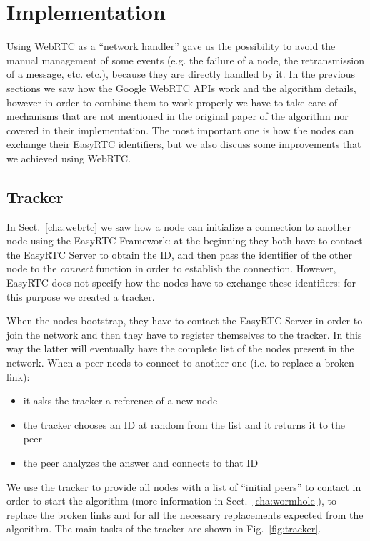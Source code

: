 
\chapter{Implementation}
\label{cha:implementation}

Using WebRTC as a ``network handler'' gave us the possibility to avoid the manual management of some events (e.g. the failure of a node, the retransmission of a message, etc. etc.), because they are directly handled by it. In the previous sections we saw how the Google WebRTC APIs work and the algorithm details, however in order to combine them to work properly we have to take care of mechanisms that are not mentioned in the original paper of the algorithm nor covered in their implementation. The most important one is how the nodes can exchange their EasyRTC identifiers, but we also discuss some improvements that we achieved using WebRTC.

\section{Tracker}
\label{cha:tracker}
In Sect.~\ref{cha:webrtc} we saw how a node can initialize a connection to another node using the EasyRTC Framework: at the beginning they both have to contact the EasyRTC Server to obtain the ID, and then pass the identifier of the other node to the \textsf{\textit{connect}} function in order to establish the connection. However, EasyRTC does not specify how the nodes have to exchange these identifiers: for this purpose we created a tracker. 

When the nodes bootstrap, they have to contact the EasyRTC Server in order to join the network and then they have to register themselves to the tracker. In this way the latter will eventually have the complete list of the nodes present in the network. When a peer needs to connect to another one (i.e. to replace a broken link):
\begin{itemize}
	\item it asks the tracker a reference of a new node
	\item the tracker chooses an ID at random from the list and it returns it to the peer
	\item the peer analyzes the answer and connects to that ID
\end{itemize}

We use the tracker to provide all nodes with a list of ``initial peers'' to contact in order to start the algorithm (more information in Sect.~\ref{cha:wormhole}), to replace the broken links and for all the necessary replacements expected from the algorithm. The main tasks of the tracker are shown in Fig.~\ref{fig:tracker}.

